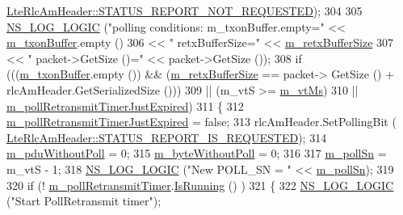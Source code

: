\begin{DoxyCode}
      \hyperlink{classns3_1_1LteRlcAmHeader_a06187336c96896fc4de926e99ed4489ea747520569cdac2a16d0cb2dade280942}{LteRlcAmHeader::STATUS\_REPORT\_NOT\_REQUESTED});
304 
305                   \hyperlink{group__logging_ga88acd260151caf2db9c0fc84997f45ce}{NS\_LOG\_LOGIC} (\textcolor{stringliteral}{"polling conditions: m\_txonBuffer.empty="} << 
      \hyperlink{classns3_1_1LteRlcAm_ad8ba4549a7c78cfe0e528d2e9cc465f8}{m\_txonBuffer}.empty () 
306                                 << \textcolor{stringliteral}{" retxBufferSize="}  << \hyperlink{classns3_1_1LteRlcAm_af270916ffd1805b027a7b9cc05c91e7d}{m\_retxBufferSize}
307                                 << \textcolor{stringliteral}{" packet->GetSize ()="} << packet->GetSize ());
308                   \textcolor{keywordflow}{if} (((\hyperlink{classns3_1_1LteRlcAm_ad8ba4549a7c78cfe0e528d2e9cc465f8}{m\_txonBuffer}.empty ()) && (\hyperlink{classns3_1_1LteRlcAm_af270916ffd1805b027a7b9cc05c91e7d}{m\_retxBufferSize} == packet->
      GetSize () + rlcAmHeader.GetSerializedSize ())) 
309                       || (m\_vtS >= \hyperlink{classns3_1_1LteRlcAm_a5fcf0776ed7e13952945d41e4b3622c7}{m\_vtMs})
310                       || \hyperlink{classns3_1_1LteRlcAm_a8233881bdfc6ca73acc56e1e41009a16}{m\_pollRetransmitTimerJustExpired})
311                     \{
312                       \hyperlink{classns3_1_1LteRlcAm_a8233881bdfc6ca73acc56e1e41009a16}{m\_pollRetransmitTimerJustExpired} = \textcolor{keyword}{false};
313                       rlcAmHeader.SetPollingBit (
      \hyperlink{classns3_1_1LteRlcAmHeader_a06187336c96896fc4de926e99ed4489eaccbbecabb140527ecb181c55db4e309d}{LteRlcAmHeader::STATUS\_REPORT\_IS\_REQUESTED});
314                       \hyperlink{classns3_1_1LteRlcAm_ac7d9ac8a68b2b0ee696d217031df6b6b}{m\_pduWithoutPoll} = 0;
315                       \hyperlink{classns3_1_1LteRlcAm_abb7cacf0298d8cd90355cbe2a0ef4afd}{m\_byteWithoutPoll} = 0;
316 
317                       \hyperlink{classns3_1_1LteRlcAm_a525db2ac020a1fafe5bc305799a80ae2}{m\_pollSn} = m\_vtS - 1;
318                       \hyperlink{group__logging_ga88acd260151caf2db9c0fc84997f45ce}{NS\_LOG\_LOGIC} (\textcolor{stringliteral}{"New POLL\_SN = "} << \hyperlink{classns3_1_1LteRlcAm_a525db2ac020a1fafe5bc305799a80ae2}{m\_pollSn});
319 
320                       \textcolor{keywordflow}{if} (! \hyperlink{classns3_1_1LteRlcAm_a9b34f6f4c6993ae026b95be1f63aacfa}{m\_pollRetransmitTimer}.\hyperlink{classns3_1_1EventId_aabf8476d1a080c199ea0c6aa9ccea372}{IsRunning} () )
321                         \{
322                           \hyperlink{group__logging_ga88acd260151caf2db9c0fc84997f45ce}{NS\_LOG\_LOGIC} (\textcolor{stringliteral}{"Start PollRetransmit timer"});

\end{DoxyCode}
